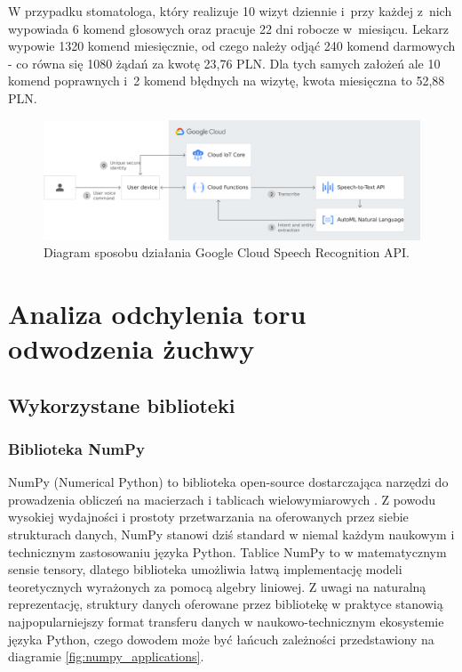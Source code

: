 W przypadku stomatologa, który realizuje 10 wizyt dziennie i~przy każdej z~nich wypowiada 6 komend głosowych oraz pracuje 22 dni robocze w~miesiącu. Lekarz wypowie 1320 komend miesięcznie, od czego należy odjąć 240 komend darmowych - co równa się 1080 żądań za kwotę 23,76 PLN. Dla tych samych założeń ale 10 komend poprawnych i~2 komend błędnych na wizytę, kwota miesięczna to 52,88 PLN.

\begin{figure}[ht!]
\centering\includegraphics[width=\textwidth]{figures/googleCloudDiagram.jpg}
\caption{Diagram sposobu działania Google Cloud Speech Recognition API.\cite{cloudSpeechAPI}}
\label{fig:googleCloudDiagram}
\end{figure}



\section{Analiza odchylenia toru odwodzenia żuchwy}

\subsection{Wykorzystane biblioteki}

\subsubsection{Biblioteka NumPy}
NumPy (Numerical Python) to biblioteka open-source dostarczająca narzędzi do prowadzenia obliczeń na macierzach i tablicach wielowymiarowych \cite{numpy}. Z powodu wysokiej wydajności i prostoty przetwarzania na oferowanych przez siebie strukturach danych, NumPy stanowi dziś standard w niemal każdym naukowym i technicznym zastosowaniu języka Python. Tablice NumPy to w matematycznym sensie tensory, dlatego biblioteka umożliwia łatwą implementację modeli teoretycznych wyrażonych za pomocą algebry liniowej. Z uwagi na naturalną reprezentację, struktury danych oferowane przez bibliotekę w praktyce stanowią najpopularniejszy format transferu danych w naukowo-technicznym ekosystemie języka Python, czego dowodem może być łańcuch zależności przedstawiony na diagramie \ref{fig:numpy_applications}.

